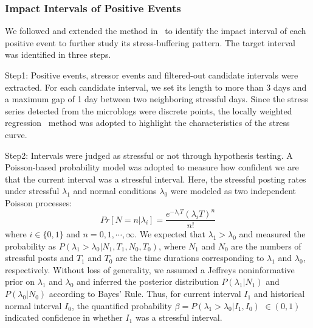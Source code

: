 \subsubsection{Impact Intervals of Positive Events}
\label{subsec:interval}
We followed and extended the method in~\citep{Li2017Analyzing} to identify the impact interval of each positive event to further study its stress-buffering pattern.
The target interval was identified in three steps.

Step1: Positive events, stressor events and filtered-out candidate intervals were extracted.
For each candidate interval,
we set its length to more than 3 days and a maximum gap of 1 day between two neighboring stressful days.
Since the stress series detected from the microblogs were discrete points,
the locally weighted regression~\citep{Cleveland1988Locally} method was adopted to highlight the characteristics of the stress curve.

Step2: Intervals were judged as stressful or not through hypothesis testing.
A Poisson-based probability model was adopted to measure how confident we are that the current interval was a stressful interval.
Here,
the stressful posting rates under stressful $\lambda_1$ and normal conditions $\lambda_0$ were modeled
as two independent Poisson processes:
\begin{equation}
Pr[N=n|\lambda_i]=\frac{e^{-\lambda_i T}{(\lambda_i T)}^n}{n!}
\end{equation}
where $i\in\{0,1\}$ and $n=0,1,\cdots,\infty$.
We expected that $\lambda_1 > \lambda_0$ and measured the probability as $P(\lambda_1>\lambda_0|N_1, T_1, N_0, T_0)$,
where $N_1$ and $N_0$ are the numbers of stressful posts
and $T_1$ and $T_0$ are the time durations corresponding to $\lambda_1$ and $\lambda_0$, respectively.
Without loss of generality, we assumed a Jeffreys noninformative prior on $\lambda_1$ and $\lambda_0$
and inferred the posterior distribution $P(\lambda_1|N_1)$ and $P(\lambda_0|N_0)$ according to Bayes' Rule.
Thus, for current interval $I_1$ and historical normal interval $I_0$,
the quantified probability $\beta = P(\lambda_1>\lambda_0|I_1,I_0)$ $\in (0,1)$
indicated confidence in whether $I_1$ was a stressful interval.

